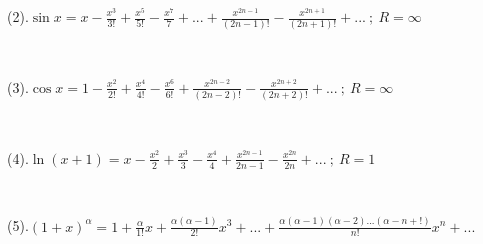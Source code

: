 \documentclass[oneside]{book}
\begin{document}
	(2).$\sin x=x-\frac{x^{3}}{3!}+\frac{x^{5}}{5!}-\frac{x^{7}}{7}+...+\frac{x^{2n-1}}{(2n-1)!}-\frac{x^{2n+1}}{(2n+1)!}+...\ ;\ R=\infty$
	
	\hspace{\fill}\
	
	(3).$\cos x=1-\frac{x^{2}}{2!}+\frac{x^{4}}{4!}-\frac{x^{6}}{6!}+\frac{x^{2n-2}}{(2n-2)!}-\frac{x^{2n+2}}{(2n+2)!}+...\ ;\ R=\infty$
	
	\hspace{\fill}\
	
	(4).$\ln (x+1)=x-\frac{x^{2}}{2}+\frac{x^{3}}{3}-\frac{x^{4}}{4}+\frac{x^{2n-1}}{2n-1}-\frac{x^{2n}}{2n}+...\ ;\ R=1$
	
	\hspace{\fill}\
	
	(5).$(1+x)^{\alpha}=1+\frac{\alpha}{1!}x+\frac{\alpha(\alpha-1)}{2!}x^{3}+...+\frac{\alpha(\alpha-1)(\alpha-2)...(\alpha-n+!)}{n!}x^{n}+...$
\end{document}
